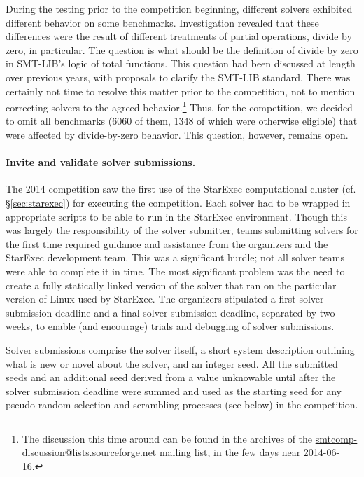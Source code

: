 \documentclass[twoside,11pt]{article}
\begin{document}
During the testing prior to the competition beginning, different solvers exhibited different behavior on some benchmarks. Investigation revealed that these differences were the result of different treatments of partial operations, divide by zero, in particular. The question is what should be the definition of divide by zero in SMT-LIB's logic of total functions. This question had been discussed at length over previous years, with proposals to clarify the SMT-LIB standard.
There was certainly not time to resolve this matter prior to the competition, not to mention correcting solvers to the agreed behavior.\footnote{The discussion this time around can be found in the archives of the \url{smtcomp-discussion@lists.sourceforge.net} mailing list, in the few days near 2014-06-16.}
Thus, for the competition, we decided to omit all benchmarks (6060 of them, 1348 of which were otherwise eligible) that were affected by divide-by-zero behavior. This question, however, remains open.

\paragraph{Invite and validate solver submissions.} The 2014 competition saw the first use of the StarExec computational cluster (cf. \S\ref{sec:starexec}) for executing the competition. Each solver had to be wrapped in appropriate scripts to be able to run in the StarExec environment. Though this was largely the responsibility of the solver submitter, teams submitting solvers for the first time required guidance and assistance from the organizers and the StarExec development team. This was a significant hurdle; not all solver teams were able to complete it in time. The most significant problem was the need to create a fully statically linked version of the solver that ran on the particular version of Linux used by StarExec. The organizers stipulated a first solver submission deadline and a final solver submission deadline, separated by two weeks, to enable (and encourage) trials and debugging of solver submissions.

Solver submissions comprise the solver itself, a short system description outlining what is new or novel about the solver, and an integer seed. All the submitted seeds and an additional seed derived from a value unknowable until after the solver submission deadline were summed and used as the starting seed for any pseudo-random selection and scrambling processes (see below) in the competition.
\end{document}
